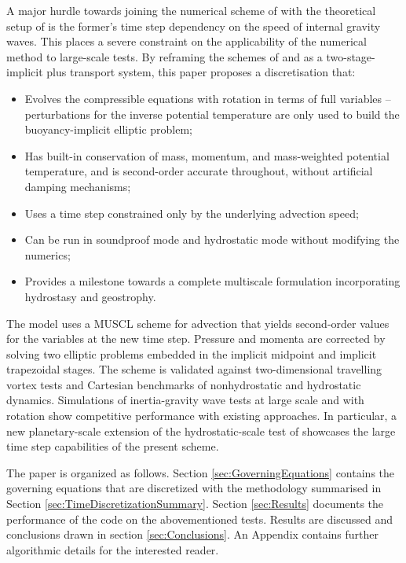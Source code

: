 \documentclass{ametsoc}
\theoremstyle{definition}
\begin{document}
A major hurdle towards joining the numerical scheme of \cite{BenacchioEtAl2014} with the theoretical setup of \cite{KleinBenacchio2016} is the former's time step dependency on the speed of internal gravity waves. This places a severe constraint on the applicability of the numerical method to large-scale tests. By reframing the schemes of \cite{KleinTCFD2009} and \cite{BenacchioEtAl2014} as a two-stage-implicit plus transport system, this paper proposes a discretisation that:
%
\begin{itemize}
\item Evolves the compressible equations with rotation in terms of full variables -- perturbations for the inverse potential temperature are only used to build the buoyancy-implicit elliptic problem;
\item Has built-in conservation of mass, momentum, and mass-weighted potential temperature, and is second-order accurate throughout, without artificial damping mechanisms;
\item Uses a time step constrained only by the underlying advection speed;
\item Can be run in soundproof mode and hydrostatic mode without modifying the numerics;
\item Provides a milestone towards a complete multiscale formulation incorporating hydrostasy and geostrophy.  
\end{itemize}

The model uses a MUSCL scheme for advection that yields second-order values for the variables at the new time step. Pressure and momenta are corrected by solving two elliptic problems embedded in the implicit midpoint and implicit trapezoidal stages. The scheme is validated  against two-dimensional travelling vortex tests and Cartesian benchmarks of nonhydrostatic and hydrostatic dynamics. Simulations of inertia-gravity wave tests at large scale and with rotation show competitive performance with existing approaches. In particular, a new planetary-scale extension of the hydrostatic-scale test of \cite{SkamarockKlemp1994} showcases the large time step capabilities of the present scheme.

The paper is organized as follows. Section \ref{sec:GoverningEquations} contains the governing equations that are discretized with the methodology summarised in Section \ref{sec:TimeDiscretizationSummary}. Section \ref{sec:Results} documents the performance of the code on the abovementioned tests. Results are discussed and conclusions drawn in section \ref{sec:Conclusions}. An Appendix contains further algorithmic details for the interested reader.
\end{document}

